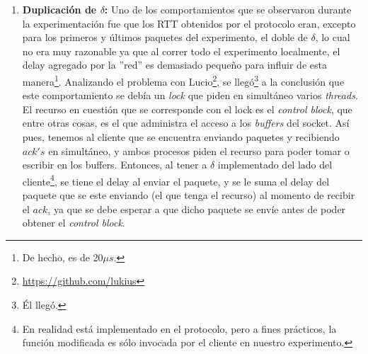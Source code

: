 \begin{enumerate}[label=(\alph*)]
        \par Para solucionar este ''inconveniente'', se podr\'ia
        rabajar con el reloj de mayor precisi\'on del sistema operativo,
        para lo cual hubiera sido necesario modificar el protocolo o implementar
        alg\'un mecanismo para utilizarlo\footnote{Utilizando los \emph{payloads
        de los paquetes quiz\'as}.}. Pero se consider\'o que estos cambios no
        terminari\'an siendo necesarios, ya que en los casos de mayor inter\'es
        (aquellos donde $\delta$ y $\phi$ tienen mayor relevancia), estos 10ms
        de m\'as que pueden aparecer en algunos paquetes tendr\'an muy poca
        influencia en el an\'alisis global.

    \bigskip
    \item \textbf{Duplicaci\'on de $\delta$:} Uno de los comportamientos que se
        observaron durante la experimentaci\'on fue que los RTT obtenidos por el
        protocolo eran, excepto para los primeros y \'ultimos paquetes del
        experimento, el doble de $\delta$, lo cual no era muy razonable ya que
        al correr todo el experimento localmente, el delay agregado por la
        ''red'' es demasiado peque\~no para influir de esta manera\footnote{De
        hecho, es de 20$\mu s$.}. Analizando el problema con
        Lucio\footnote{\url{https://github.com/lukius}}, se
        lleg\'o\footnote{\'El lleg\'o.} a la conclusi\'on que este
        comportamiento se deb\'ia un \emph{lock} que piden en simult\'aneo
        varios \emph{threads}. El recurso en cuesti\'on que se corresponde con
        el lock es el \emph{control block}, que entre otras cosas, es el que
        administra el acceso a los \emph{buffers} del socket. As\'i pues,
        tenemos al cliente que se encuentra enviando paquetes y recibiendo
        $ack's$ en simult\'aneo, y ambos procesos piden el recurso para poder
        tomar o escribir en los buffers. Entonces, al tener a $\delta$
        implementado del lado del cliente\footnote{En realidad est\'a
        implementado en el protocolo, pero a fines pr\'acticos, la funci\'on
        modificada es s\'olo invocada por el cliente en nuestro experimento.},
        se tiene el delay al enviar el paquete, y se le suma el delay del
        paquete que se este enviando (el que tenga el recurso) al momento de
        recibir el $ack$, ya que se debe esperar a que dicho paquete se env\'ie
        antes de poder obtener el \emph{control block}.


\end{enumerate}
